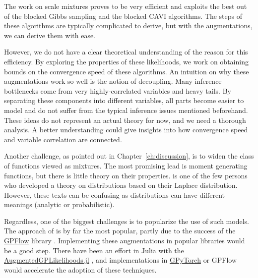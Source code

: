 

\graphicspath{{9_conclusion/figures/}}
The work on scale mixtures proves to be very efficient and exploits the best out of the blocked Gibbs sampling and the blocked \ac{CAVI} algorithms.
The steps of these algorithms are typically complicated to derive, but with the augmentations, we can derive them with ease.

However, we do not have a clear theoretical understanding of the reason for this efficiency.
By exploring the properties of these likelihoods, we work on obtaining bounds on the convergence speed of these algorithms.
An intuition on why these augmentations work so well is the notion of decoupling.
Many inference bottlenecks come from very highly-correlated variables and heavy tails.
By separating these components into different variables, all parts become easier to model and do not suffer from the typical inference issues mentioned beforehand.
These ideas do not represent an actual theory for now, and we need a thorough analysis.
A better understanding could give insights into how convergence speed and variable correlation are connected.

Another challenge, as pointed out in Chapter~\ref{ch:discussion}, is to widen the class of functions viewed as mixtures.
The most promising lead is moment generating functions, but there is little theory on their properties.
\citet{schwartz1952transformation} is one of the few persons who developed a theory on distributions based on their Laplace distribution. However, these texts can be confusing as distributions can have different meanings (analytic or probabilistic).

Regardless, one of the biggest challenges is to popularize the use of such models.
The approach of \citet{Hensman2015} is by far the most popular, partly due to the success of the \href{https://github.com/GPflow/GPflow}{GPFlow} library \cite{GPflow2017}.
Implementing these augmentations in popular libraries would be a good step.
There have been an effort in Julia with the \href{https://github.com/JuliaGaussianProcesses/AugmentedGPLikelihoods.jl}{AugmentedGPLikelihoods.jl} \cite{theo_galy_fajou_2022_6347022}, and implementations in \href{https://gpytorch.ai/}{GPyTorch} \cite{gardner2018gpytorch} or GPFlow would accelerate the adoption of these techniques.



